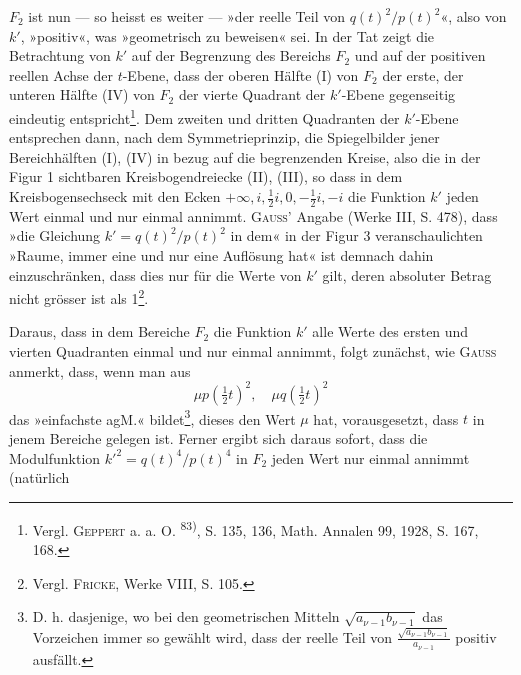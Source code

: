 \noindent \(F_2\) ist nun — so heisst es weiter — »der reelle Teil von \(q(t)^2/p(t)^2\)«, also von
\(k'\), »positiv«, was »geometrisch zu beweisen« sei. In der Tat zeigt die Betrachtung
von \(k'\) auf der Begrenzung des Bereichs \(F_2\) und auf der positiven
reellen Achse der \(t\)-Ebene, dass der oberen Hälfte (I) von \(F_2\) der
erste, der unteren Hälfte (IV) von \(F_2\) der vierte Quadrant der \(k'\)-Ebene
gegenseitig eindeutig entspricht\footnote{Vergl. \textsc{Geppert} a. a. O. \textsuperscript{83)}, S. 135, 136, Math. Annalen 99, 1928, S. 167, 168.}. Dem zweiten und dritten Quadranten
der \(k'\)-Ebene entsprechen dann, nach dem Symmetrieprinzip, die Spiegelbilder
jener Bereichhälften (I), (IV) in bezug auf die begrenzenden Kreise,
also die in der Figur 1 sichtbaren Kreisbogendreiecke (II), (III), so dass in
dem Kreisbogensechseck mit den Ecken \(+\infty,i,\frac12i,0,-\frac12i,-i\) die Funktion
\(k'\) jeden Wert einmal und nur einmal annimmt. \textsc{Gauss'} Angabe (Werke III,
S. 478), dass »die Gleichung \(k'=q(t)^2/p(t)^2\) in dem« in der Figur 3 veranschaulichten »Raume, immer
eine und nur eine Auflösung hat« ist demnach dahin einzuschränken, dass dies nur für die Werte
von \(k'\) gilt, deren absoluter Betrag nicht grösser ist als 1\footnote{Vergl. \textsc{Fricke}, Werke VIII, S. 105.}.
\begin{center}
\end{center}
\noindent Daraus, dass in dem Bereiche \(F_2\) die
Funktion \(k'\) alle Werte des ersten und vierten Quadranten einmal und nur
einmal annimmt, folgt zunächst, wie \textsc{Gauss} anmerkt, dass, wenn man aus
\[
\mu p(\tfrac12t)^2,\quad\mu q(\tfrac12t)^2
\]
\noindent das »einfachste agM.« bildet\footnote{D. h. dasjenige, wo bei den geometrischen Mitteln \(\sqrt{a_{\nu-1}b_{\nu-1}}\) das Vorzeichen immer so gewählt wird, dass der reelle Teil von \(\frac{\sqrt{a_{\nu-1}b_{\nu-1}}}{a_{\nu-1}}\) positiv ausfällt.}, dieses den Wert \(\mu\) hat, vorausgesetzt, dass \(t\)
in jenem Bereiche gelegen ist. Ferner ergibt sich daraus sofort, dass die
Modulfunktion \(k'^2=q(t)^4/p(t)^4\) in \(F_2\) jeden Wert nur einmal annimmt (natürlich
